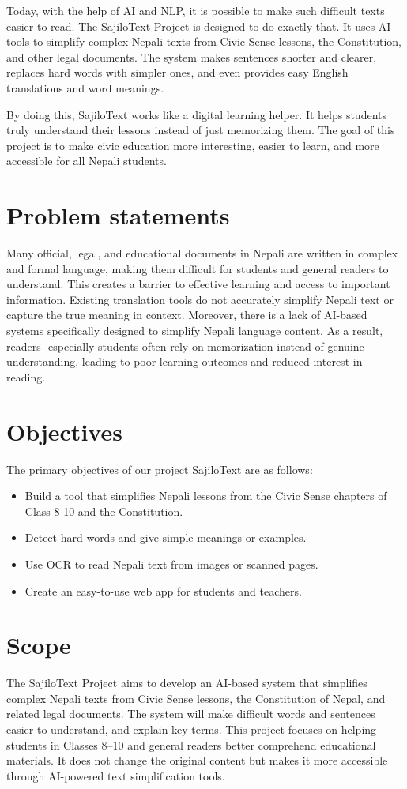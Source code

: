 \documentclass[12pt]{report}
\begin{document}
Today, with the help of AI and NLP, it is possible to make such difficult texts easier to read. The SajiloText Project is designed to do exactly that. It uses AI tools to simplify complex Nepali texts from Civic Sense lessons, the Constitution, and other legal documents. The system makes sentences shorter and clearer, replaces hard words with simpler ones, and even provides easy English translations and word meanings.

By doing this, SajiloText works like a digital learning helper. It helps students truly understand their lessons instead of just memorizing them. The goal of this project is to make civic education more interesting, easier to learn, and more accessible for all Nepali students.
\section{Problem statements}
Many official, legal, and educational documents in Nepali are written in complex and formal language, making them difficult for students and general readers to understand. This creates a barrier to effective learning and access to important information. Existing translation tools do not accurately simplify Nepali text or capture the true meaning in context. Moreover, there is a lack of AI-based systems specifically designed to simplify Nepali language content. As a result, readers- especially students often rely on memorization instead of genuine understanding, leading to poor learning outcomes and reduced interest in reading.
\section{Objectives}
 The primary objectives of our project SajiloText are as follows:
\begin{itemize}
\item Build a tool that simplifies Nepali lessons from the Civic Sense chapters of Class 8-10 and the Constitution. 

\item Detect hard words and give simple meanings or examples.
\item Use OCR to read Nepali text from images or scanned pages.
\item Create an easy-to-use web app for students and teachers.
\end{itemize}
\section{Scope}
The SajiloText Project aims to develop an AI-based system that simplifies complex Nepali texts from Civic Sense lessons, the Constitution of Nepal, and related legal documents. The system will make difficult words and sentences easier to understand, and explain key terms. This project focuses on helping students in Classes 8–10 and general readers better comprehend educational materials. It does not change the original content but makes it more accessible through AI-powered text simplification tools.
\end{document}

